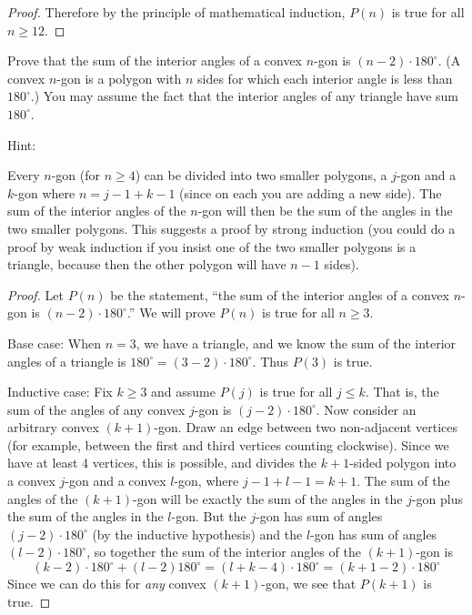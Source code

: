 \documentclass[10pt]{exam}
\begin{document}
\begin{questions}
\begin{solution}
\begin{proof}
      Therefore by the principle of mathematical induction, $P(n)$ is true for all $n \ge 12$.
    \end{proof}
  \end{solution}


  \question[8] Prove that the sum of the interior angles of a convex $n$-gon is $(n-2)\cdot 180^\circ$.  (A convex $n$-gon is a polygon with $n$ sides for which each interior angle is less than $180^\circ$.)  You may assume the fact that the interior angles of any triangle have sum $180^\circ$.

  Hint:


  \begin{solution}
  Every $n$-gon (for $n \ge 4$) can be divided into two smaller polygons, a $j$-gon and a $k$-gon where $n = j-1 + k-1$ (since on each you are adding a new side). The sum of the interior angles of the $n$-gon will then be the sum of the angles in the two smaller polygons.  This suggests a proof by strong induction (you could do a proof by weak induction if you insist one of the two smaller polygons is a triangle, because then the other polygon will have $n-1$ sides).

  \begin{proof}
  Let $P(n)$ be the statement, ``the sum of the interior angles of a convex $n$-gon is $(n-2)\cdot 180^\circ$.''  We will prove $P(n)$ is true for all $n \ge 3$.

  Base case: When $n=3$, we have a triangle, and we know the sum of the interior angles of a triangle is $180^\circ = (3-2)\cdot 180^\circ$.  Thus $P(3)$ is true.

  Inductive case: Fix $k \ge 3$ and assume $P(j)$ is true for all $j \le k$.  That is, the sum of the angles of any convex $j$-gon is $(j-2)\cdot 180^\circ$.  Now consider an arbitrary convex $(k+1)$-gon.  Draw an edge between two non-adjacent vertices (for example, between the first and third vertices counting clockwise).  Since we have at least 4 vertices, this is possible, and divides the $k+1$-sided polygon into a convex $j$-gon and a convex $l$-gon, where $j-1+l-1 = k+1$.  The sum of the angles of the $(k+1)$-gon will be exactly the sum of the angles in the $j$-gon plus the sum of the angles in the $l$-gon.
  But the $j$-gon has sum of angles $(j-2)\cdot 180^\circ$ (by the inductive hypothesis) and the $l$-gon has sum of angles $(l-2)\cdot 180^\circ$, so together the sum of the interior angles of the $(k+1)$-gon is
  \[(k-2)\cdot 180^\circ + (l-2)180^\circ = (l+k-4)\cdot 180^\circ = (k+1-2)\cdot 180^\circ\]
  Since we can do this for \emph{any} convex $(k+1)$-gon, we see that $P(k+1)$ is true.


\end{proof}
\end{solution}
\end{questions}
\end{document}
